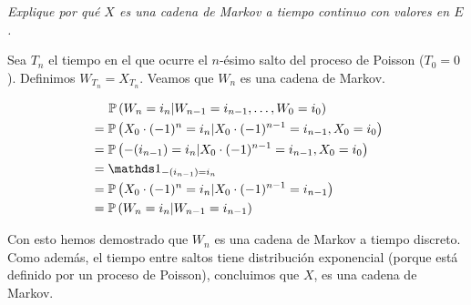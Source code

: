 \emph{
    Explique por qu\'e $X$ es una cadena de Markov a tiempo continuo con valores en $E$.\pn 
}

\afterstatement\pn

Sea $T_n$ el tiempo en el que ocurre el $n$-ésimo salto del proceso de Poisson
($T_0 = 0$). Definimos $W_{T_n} = X_{T_n}$. Veamos que $W_n$ es una cadena de Markov.

\begin{align}
    & \;\;\;\;\; \P\left(W_n = i_n | W_{n-1} = i_{n-1}, \dots, W_0 = i_0 \right)                \\
    & =\P\left(X_0 \cdot (-1)^n  = i_n | X_0 \cdot (-1)^{n-1}  = i_{n-1}, X_0 = i_{0} \right)   \\
    & =\P\left( -(i_{n-1})  = i_n | X_0 \cdot (-1)^{n-1}  = i_{n-1}, X_0 = i_{0} \right)        \\
    & =\indic_{-(i_{n-1})  = i_n}                                                               \\
    & =\P\left(X_0 \cdot (-1)^n  = i_n | X_0 \cdot (-1)^{n-1}  = i_{n-1}\right)                 \\
    & =\P\left(W_n  = i_n | W_{n-1}  = i_{n-1}\right)                                                 
\end{align}\pn

Con esto hemos demostrado que $W_n$ es una cadena de Markov a tiempo discreto. Como además,
el tiempo entre saltos tiene distribución exponencial (porque está definido por un proceso de Poisson),
concluimos que $X$, es una cadena de Markov.